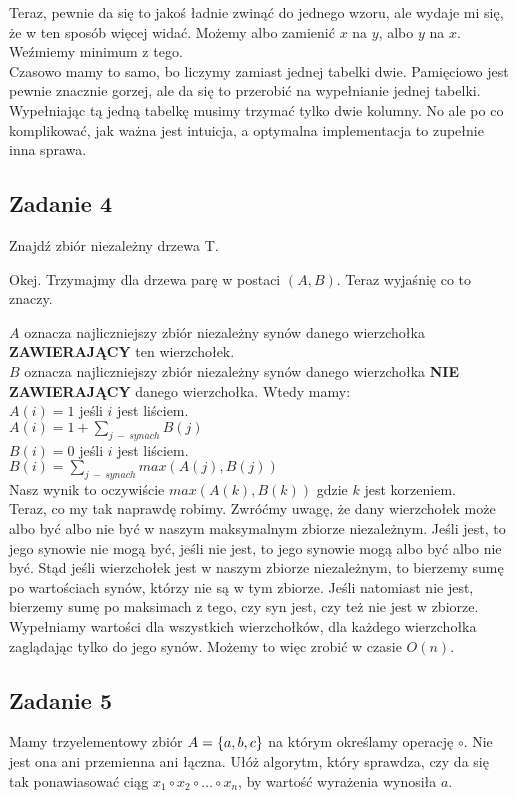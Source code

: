 \documentclass[a4paper]{article}
\DeclarePairedDelimiter\set{\lbrace}{\rbrace}
\begin{document}
Teraz, pewnie da się to jakoś ładnie zwinąć do jednego wzoru, ale wydaje mi się, że w ten sposób więcej widać. Możemy albo zamienić $x$ na $y$, albo $y$ na $x$. Weźmiemy minimum z tego.\\
Czasowo mamy to samo, bo liczymy zamiast jednej tabelki dwie. Pamięciowo jest pewnie znacznie gorzej, ale da się to przerobić na wypełnianie jednej tabelki. Wypełniając tą jedną tabelkę musimy trzymać tylko dwie kolumny. No ale po co komplikować, jak ważna jest intuicja, a optymalna implementacja to zupełnie inna sprawa.

\subsection*{Zadanie 4}
Znajdź zbiór niezależny drzewa T.

Okej. Trzymajmy dla drzewa parę w postaci $(A,B)$. Teraz wyjaśnię co to znaczy.

$A$ oznacza najliczniejszy zbiór niezależny synów danego wierzchołka \textbf{ZAWIERAJĄCY} ten wierzchołek.
\\$B$ oznacza najliczniejszy zbiór niezależny synów danego wierzchołka \textbf{NIE ZAWIERAJĄCY} danego wierzchołka. Wtedy mamy:\\
$A(i)=1$ jeśli $i$ jest liściem.\\
$A(i)=1+\sum_{j\ -\ synach} B(j)$\\
$B(i)=0$ jeśli $i$ jest liściem.\\
$B(i)=\sum_{j\ -\ synach} max(A(j),B(j))$\\
Nasz wynik to oczywiście $max(A(k),B(k))$ gdzie $k$ jest korzeniem.\\
Teraz, co my tak naprawdę robimy. Zwróćmy uwagę, że dany wierzchołek może albo być albo nie być w naszym maksymalnym zbiorze niezależnym. Jeśli jest, to jego synowie nie mogą być, jeśli nie jest, to jego synowie mogą albo być albo nie być. Stąd jeśli wierzchołek jest w naszym zbiorze niezależnym, to bierzemy sumę po wartościach synów, którzy nie są w tym zbiorze. Jeśli natomiast nie jest, bierzemy sumę po maksimach z tego, czy syn jest, czy też nie jest w zbiorze.\\
Wypełniamy wartości dla wszystkich wierzchołków, dla każdego wierzchołka zaglądając tylko do jego synów. Możemy to więc zrobić w czasie $O(n)$.

\subsection*{Zadanie 5}
Mamy trzyelementowy zbiór $A=\set{a,b,c}$ na którym określamy operację $\circ$. Nie jest ona ani przemienna ani łączna. Ułóż algorytm, który sprawdza, czy da się tak ponawiasować ciąg $x_1 \circ x_2 \circ \dots \circ x_n$, by wartość wyrażenia wynosiła $a$.
\end{document}
